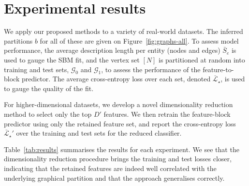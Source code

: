 \section{Experimental results}
\label{sec:experiments}

We apply our proposed methods to a variety of real-world datasets.
The inferred partitions $b$ for all of these are given on Figure~\ref{fig:graphs-all}.
To assess model performance,
%
the average
description length per entity (nodes and edges) 
$\bar{S}_e$ 
is used to gauge the SBM fit,
and
the vertex set $[N]$ is partitioned at random into training and test sets, 
$\mathcal{G}_0$ and $\mathcal{G}_1$,
%
to assess the performance of the feature-to-block predictor.
The average cross-entropy loss 
over each set,
denoted $\bar{\mathcal{L}}_\star$,
is used to gauge the quality of the fit.

For higher-dimensional datasets, we develop a novel 
dimensionality reduction method to select only the top $D'$ features.  
We then retrain the feature-block predictor using only the retained 
feature set, and report the cross-entropy loss 
$\bar{\mathcal{L}}_\star'$
over the training and 
test sets for the reduced classifier.

Table~\ref{tab:results} summarises the results for each experiment. 
We see that the dimensionality reduction procedure 
brings the training and test losses closer, indicating that
the retained features
are indeed well correlated with the underlying graphical 
partition and that the approach generalises correctly. 
